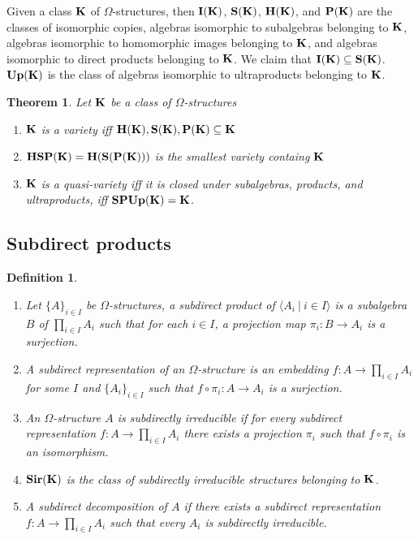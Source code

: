 \documentclass[a4paper]{article}
\theoremstyle{defin}
\newtheorem{defin}{Definition}
\theoremstyle{theorem}
\newtheorem{theorem}{Theorem}
\theoremstyle{prop}
\theoremstyle{lemma}
\theoremstyle{ex}
\theoremstyle{col}
\begin{document}
Given a class ${\bf K}$ of $\Omega$-structures, then ${\bf I}({\bf K})$, ${\bf S}({\bf K})$, ${\bf H}({\bf K})$, and ${\bf P}({\bf K})$ are
the classes of isomorphic copies, algebras isomorphic to subalgebras belonging to ${\bf K}$,
algebras isomorphic to homomorphic images belonging to ${\bf K}$, and algebras isomorphic to direct products belonging to ${\bf K}$.
We claim that ${\bf I}({\bf K}) \subseteq {\bf S}({\bf K})$. ${\bf Up}({\bf K})$ is the class of algebras isomorphic to ultraproducts
belonging to ${\bf K}$.

\begin{theorem} Let ${\bf K}$ be a class of $\Omega$-structures

  \begin{enumerate}
    \item ${\bf K}$ is a variety iff ${\bf H}({\bf K}), {\bf S}({\bf K}), {\bf P}({\bf K}) \subseteq {\bf K}$
    \item ${\bf HSP}({\bf K}) = {\bf H}({\bf S}({\bf P}({\bf K})))$ is the smallest variety containg ${\bf K}$
    \item ${\bf K}$ is a quasi-variety iff it is closed under subalgebras, products, and ultraproducts, iff ${\bf SPUp}({\bf K}) = {\bf K}$.
  \end{enumerate}
\end{theorem}

\subsection{Subdirect products}

\begin{defin}
  $ $

  \begin{enumerate}
    \item Let $\{ A \}_{i \in I}$ be $\Omega$-structures, a subdirect product of $\langle A_i \: | \: i \in I \rangle$ is a
    subalgebra $B$ of $\prod \limits_{i \in I} A_i$ such that for each $i \in I$, a projection map $\pi_i : B \to A_i$ is a surjection.
    \item A subdirect representation of an $\Omega$-structure is an embedding $f : A \to \prod \limits_{i \in I} A_i$ for some $I$ and
    $\{ A_i \}_{i \in I}$ such that $f \circ \pi_i : A \to A_i$ is a surjection.
    \item An $\Omega$-structure $A$ is subdirectly irreducible if for every subdirect representation $f : A \to \prod \limits_{i \in I} A_i$
    there exists a projection $\pi_i$ such that $f \circ \pi_i$ is an isomorphism.
    \item ${\bf Sir}({\bf K})$ is the class of subdirectly irreducible structures belonging to ${\bf K}$.
    \item A subdirect decomposition of $A$ if there exists a subdirect representation $f : A \to \prod \limits_{i \in I} A_i$ such that
    every $A_i$ is subdirectly irreducible.
  \end{enumerate}
\end{defin}
\end{document}
